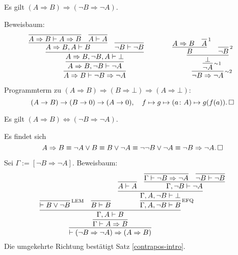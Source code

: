 \begin{Satz}\label{contrapos-intro}\newlinefirst
Es gilt $(A\Rightarrow B)\Rightarrow (\neg B\Rightarrow\neg A)$.
\end{Satz}
\begin{Beweis}[Beweis] Beweisbaum:
\[
\begin{array}{@{}l@{\qquad\qquad}l}
\infer{A\Rightarrow B\vdash \neg B\Rightarrow\neg A}{
  \infer{A\Rightarrow B, \neg B\vdash\neg A}{
    \infer{A\Rightarrow B, \neg B, A\vdash\bot}{
      \infer{A\Rightarrow B, A\vdash B}{
        \infer{A\Rightarrow B\vdash A\Rightarrow B}{}
      & \infer{A\vdash A}{}}
    & \infer{\neg B\vdash\neg B}{}}}}
&
\infer[\infernote{$\sim$2}]{\neg B\Rightarrow\neg A}{
  \infer[\infernote{$\sim$1}]{\neg A}{
    \infer{\bot}{
      \infer{B}{A\Rightarrow B & \infer[\infernote{1}]{A}{}}
    & \infer[\infernote{2}]{\neg B}{}}}}
\end{array}
\]
Programmterm zu $(A\Rightarrow B)\Rightarrow (B\Rightarrow\bot)\Rightarrow (A\Rightarrow\bot)$:
\[(A\to B)\to (B\to 0)\to (A\to 0),\quad
f\mapsto g\mapsto (a\colon A)\mapsto g(f(a)).\,\square\]
\end{Beweis}

\begin{Satz} \strong{[LEM]}\newlinefirst
Es gilt $(A\Rightarrow B)\Leftrightarrow (\neg B\Rightarrow\neg A)$.
\end{Satz}
\begin{Beweis}
Es findet sich
\[A\Rightarrow B \equiv \neg A\lor B\equiv B\lor\neg A
\equiv \neg\neg B\lor\neg A \equiv \neg B\Rightarrow \neg A.\,\square\]
\end{Beweis}
\begin{Beweis}
Sei $\Gamma:=[\neg B\Rightarrow\neg A]$. Beweisbaum:
\[
\infer{\vdash (\neg B\Rightarrow\neg A)\Rightarrow (A\Rightarrow B)}{
  \infer{\Gamma\vdash A\Rightarrow B}{
    \infer{\Gamma,A\vdash B}{
      \infer[\infernote{LEM}]{\vdash B\lor \neg B}{}
      & \infer{B\vdash B}{}
      & \infer[\infernote{EFQ}]{\Gamma,A,\neg B\vdash B}{
        \infer{\Gamma,A,\neg B\vdash\bot}{
          \infer{A\vdash A}{}
          & \infer{\Gamma,\neg B\vdash\neg A}{
            \infer{\Gamma\vdash\neg B\Rightarrow\neg A}{}
            & \infer{\neg B\vdash\neg B}{}}}}}}}
\]
Die umgekehrte Richtung bestätigt Satz \ref{contrapos-intro}.\,\qedsymbol
\end{Beweis}

